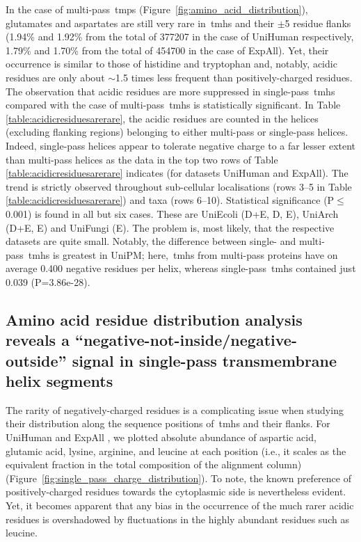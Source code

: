 In the case of multi\--pass~\gls{tmp}s (Figure~\ref{fig:amino_acid_distribution}), glutamates and aspartates are still very rare in~\gls{tmh}s and their $\pm$5 residue flanks (1.94\% and 1.92\% from the total of 377207 in the case of UniHuman respectively, 1.79\% and 1.70\% from the total of 454700 in the case of ExpAll).
Yet, their occurrence is similar to those of histidine and tryptophan and, notably, acidic residues are only about $\sim$1.5 times less frequent than positively\--charged residues.
The observation that acidic residues are more suppressed in single\--pass~\gls{tmh}s compared with the case of multi\--pass~\gls{tmh}s is statistically significant.
In Table \ref{table:acidicresiduesarerare}, the acidic residues are counted in the helices (excluding flanking regions) belonging to either multi\--pass or single\--pass helices.
Indeed, single\--pass helices appear to tolerate negative charge to a far lesser extent than multi\--pass helices as the data in the top two rows of Table \ref{table:acidicresiduesarerare} indicates (for datasets UniHuman and ExpAll).
The trend is strictly observed throughout sub-cellular localisations (rows 3--5 in Table \ref{table:acidicresiduesarerare}) and taxa (rows 6--10).
Statistical significance (P$\leq$0.001) is found in all but six cases.
These are UniEcoli (D+E, D, E), UniArch (D+E, E) and UniFungi (E).
The problem is, most likely, that the respective datasets are quite small.
Notably, the difference between single- and multi\--pass~\gls{tmh}s is greatest in UniPM\@; here,~\gls{tmh}s from multi\--pass proteins have on average 0.400 negative residues per helix, whereas single\--pass~\gls{tmh}s contained just 0.039 (P=3.86e-28).

\subsection{Amino acid residue distribution analysis reveals a ``negative-not-inside/negative-outside'' signal in single\--pass transmembrane helix segments}

The rarity of negatively\--charged residues is a complicating issue when studying their distribution along the sequence positions of~\gls{tmh}s and their flanks.
For UniHuman and ExpAll , we plotted absolute abundance of aspartic acid, glutamic acid, lysine, arginine, and leucine at each position (i.e., it scales as the equivalent fraction in the total composition of the alignment column) (Figure~\ref{fig:single_pass_charge_distribution}).
To note, the known preference of positively\--charged residues towards the cytoplasmic side is nevertheless evident.
Yet, it becomes apparent that any bias in the occurrence of the much rarer acidic residues is overshadowed by fluctuations in the highly abundant residues such as leucine.

